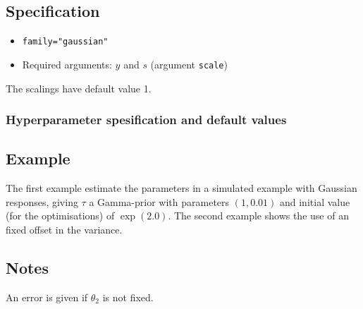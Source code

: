 \documentclass[a4paper,11pt]{article}
\begin{document}
\subsection*{Specification}

\begin{itemize}
\item \texttt{family="gaussian"}
\item Required arguments: $y$ and $s$ (argument \texttt{scale})
\end{itemize}
The scalings have default value 1.

\subsubsection*{Hyperparameter spesification and default values}


\subsection*{Example}

The first example estimate the parameters in a simulated example with
Gaussian responses, giving $\tau$ a Gamma-prior with parameters
$(1, 0.01)$ and initial value (for the optimisations) of $\exp(2.0)$.
The second example shows the use of an fixed offset in the variance.


\subsection*{Notes}

An error is given if $\theta_2$ is not fixed. 
\end{document}
